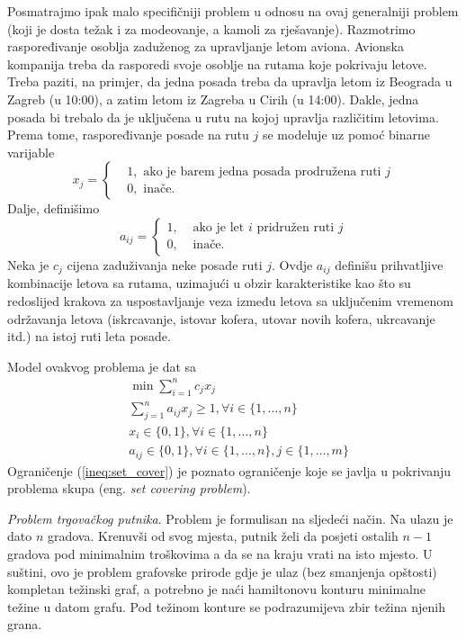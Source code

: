\documentclass[a4paper, utf8, 11pt, colorlinks]{book}
\begin{document}
Posmatrajmo ipak malo specifičniji problem u odnosu na ovaj generalniji problem (koji je dosta težak i za modeovanje, a kamoli za rješavanje). 
Razmotrimo raspoređivanje osoblja zaduženog za upravljanje letom aviona. 
Avionska kompanija treba da rasporedi svoje osoblje na rutama koje pokrivaju letove. Treba paziti, na primjer, da jedna posada treba da upravlja letom iz  Beograda u Zagreb (u 10:00), a zatim letom iz Zagreba u Cirih (u 14:00). Dakle, jedna posada bi trebalo da je uključena u rutu na kojoj upravlja različitim letovima. Prema tome, raspoređivanje posade na rutu $j$ se modeluje uz pomoć binarne varijable 
$$x_j = \begin{cases}
    &1, \mbox{ ako je barem jedna posada prodružena ruti } j \\
    &0, \mbox{ inače}. 
\end{cases}
$$
Dalje, definišimo 
$$a_{ij}= \begin{cases}
             1,& \mbox{ ako je let } i \mbox{ pridružen ruti } j \\
             0,& \mbox{ inače}.
        \end{cases}
$$
Neka je $c_j$ cijena zaduživanja neke posade ruti $j$. Ovdje $a_{ij}$ definišu prihvatljive kombinacije letova sa rutama, uzimajući u obzir  karakteristike kao što su redoslijed krakova za uspostavljanje veza između letova sa uključenim vremenom  održavanja letova (iskrcavanje, istovar  kofera, utovar   novih kofera, ukrcavanje itd.) na istoj ruti leta posade.   

Model ovakvog problema je dat sa 
\begin{align}
    &\min \sum_{i=1}^n c_j x_j \nonumber\\
    & \sum_{j=1}^n a_{ij} x_j \geq 1, \forall i \in \{1,\ldots, n\} \label{ineq:set_cover} \\
    & x_i \in \{0, 1 \}, \forall i \in \{1, \ldots, n\} \\
    & a_{ij} \in \{0, 1\}, \forall i \in \{1, \ldots, n\}, j \in\{1,\ldots, m\} \nonumber
\end{align}
Ograničenje (\ref{ineq:set_cover}) je poznato ograničenje koje se javlja u pokrivanju problema skupa (eng. \emph{set covering problem}).

\emph{Problem trgovačkog putnika}. Problem je formulisan na sljedeći način. Na ulazu je dato $n$ gradova. Krenuvši od svog mjesta, putnik želi da posjeti ostalih $n-1$ gradova pod minimalnim troškovima a da se na kraju vrati na isto mjesto. U suštini, ovo je problem grafovske prirode gdje je ulaz (bez smanjenja opštosti) kompletan težinski graf, a potrebno je naći hamiltonovu konturu minimalne težine u datom grafu. Pod težinom konture se podrazumijeva zbir težina njenih grana. 
\end{document}
